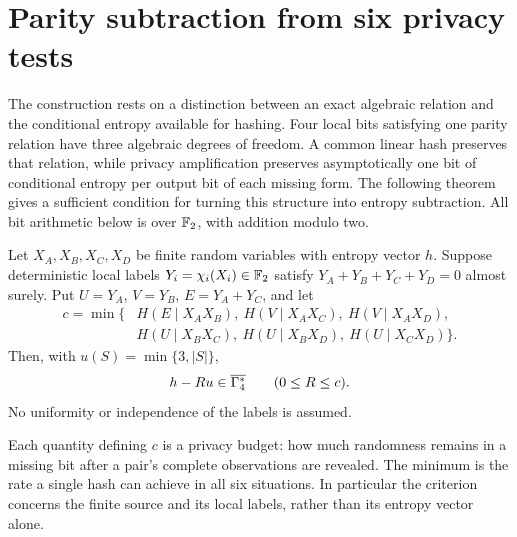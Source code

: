 \section{Parity subtraction from six privacy tests}\label{sec:general}\label{sec:construction}
The construction rests on a distinction between an exact algebraic
relation and the conditional entropy available for hashing. Four local bits
satisfying one parity relation have three algebraic degrees of freedom.
A common linear hash preserves that relation, while privacy amplification
preserves asymptotically one bit of conditional entropy per output bit
of each missing form. The following theorem gives a sufficient
condition for turning this structure into entropy subtraction.
All bit arithmetic below is over $\mathbb F_2$, with addition modulo two.

\begin{samepage}
\begin{theorem}\label{thm:general}
Let $X_A,X_B,X_C,X_D$ be finite random variables with entropy vector $h$.
Suppose deterministic local labels $Y_i=\chi_i(X_i)\in\mathbb F_2$ satisfy
$Y_A+Y_B+Y_C+Y_D=0$ almost surely. Put
$U=Y_A$, $V=Y_B$, $E=Y_A+Y_C$, and let
\begin{align*}
 c=\min\{&H(E\mid X_AX_B),\ H(V\mid X_AX_C),\ H(V\mid X_AX_D),\\
         &H(U\mid X_BX_C),\ H(U\mid X_BX_D),\ H(U\mid X_CX_D)\}.
\end{align*}
Then, with $u(S)=\min\{3,|S|\}$,
\[
 h-Ru\in\overline{\Gamma_4^{*}}\qquad(0\le R\le c).
\]
No uniformity or independence of the labels is assumed.
\end{theorem}
\end{samepage}

Each quantity defining $c$ is a privacy budget: how much randomness
remains in a missing bit after a pair's complete observations are
revealed. The minimum is the rate a single hash can achieve in all six
situations. In particular the criterion concerns the finite source and
its local labels, rather than its entropy vector alone.

